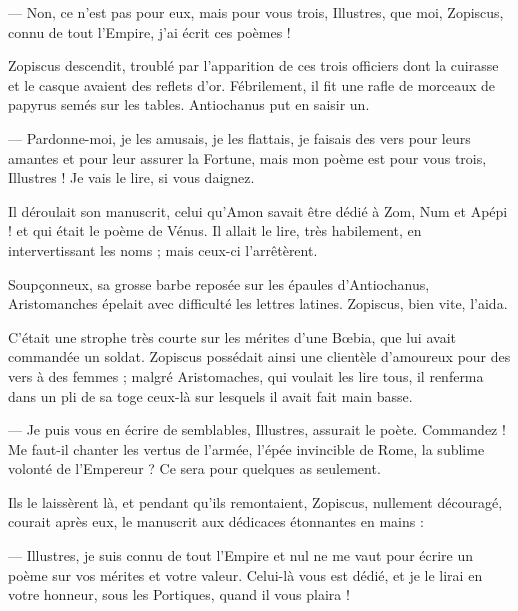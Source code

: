 \documentclass[a4paper, 11pt, oneside, polutonikogreek, french]{article}
\begin{document}
--- Non, ce n'est pas pour eux, mais pour vous trois, Illustres, que moi, Zopiscus, connu de tout l'Empire, j'ai écrit ces poèmes !

Zopiscus descendit, troublé par l'apparition de ces trois officiers dont la cuirasse et le casque avaient des reflets d'or. Fébrilement, il fit une rafle de morceaux de papyrus semés sur les tables. Antiochanus put en saisir un.

--- Pardonne-moi, je les amusais, je les flattais, je faisais des vers pour leurs amantes et pour leur assurer la Fortune, mais mon poème est pour vous trois, Illustres ! Je vais le lire, si vous daignez.

Il déroulait son manuscrit, celui qu'Amon savait être dédié à Zom, Num et Apépi ! et qui était le poème de Vénus. Il allait le lire, très habilement, en intervertissant les noms ; mais ceux-ci l'arrêtèrent.

Soupçonneux, sa grosse barbe reposée sur les épaules d'Antiochanus, Aristomanches épelait avec difficulté les lettres latines. Zopiscus, bien vite, l'aida.

C'était une strophe très courte sur les mérites d'une Bœbia, que lui avait commandée un soldat. Zopiscus possédait ainsi une clientèle d'amoureux pour des vers à des femmes ; malgré Aristomaches, qui voulait les lire tous, il renferma dans un pli de sa toge ceux-là sur lesquels il avait fait main basse.

--- Je puis vous en écrire de semblables, Illustres, assurait le poète. Commandez ! Me faut-il chanter les vertus de l'armée, l'épée invincible de Rome, la sublime volonté de l’Empereur ? Ce sera pour quelques as seulement.

Ils le laissèrent là, et pendant qu'ils remontaient, Zopiscus, nullement découragé, courait après eux, le manuscrit aux dédicaces étonnantes en mains :

--- Illustres, je suis connu de tout l'Empire et nul ne me vaut pour écrire un poème sur vos mérites et votre valeur. Celui-là vous est dédié, et je le lirai en votre honneur, sous les Portiques, quand il vous plaira !
\end{document}
